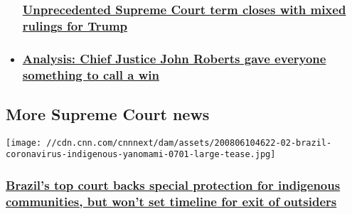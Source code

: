 \begin{itemize}
{  \subsubsection{\texorpdfstring{\href{/2020/07/10/politics/supreme-court-term-end-conservatives-liberals/index.html}{Unprecedented
  Supreme Court term closes with mixed rulings for
  Trump}}{Unprecedented Supreme Court term closes with mixed rulings for Trump}}\label{unprecedented-supreme-court-term-closes-with-mixed-rulings-for-trump}}
\item
  \hypertarget{analysis-chief-justice-john-roberts-gave-everyone-something-to-call-a-win-}{%
  \subsubsection{\texorpdfstring{\href{/2020/07/09/politics/john-roberts-supreme-court/index.html}{\textbf{Analysis:}
  Chief Justice John Roberts gave everyone something to call a win
  }}{Analysis: Chief Justice John Roberts gave everyone something to call a win }}\label{analysis-chief-justice-john-roberts-gave-everyone-something-to-call-a-win-}}
\end{itemize}

\hypertarget{more-supreme-court-news-}{%
\subsection{More Supreme Court news~}\label{more-supreme-court-news-}}

\href{/2020/08/08/americas/brazil-supreme-court-indigenous-ruling-intl/index.html}{}

\texttt{[image: //cdn.cnn.com/cnnnext/dam/assets/200806104622-02-brazil-coronavirus-indigenous-yanomami-0701-large-tease.jpg]}

\hypertarget{brazils-top-court-backs-special-protection-for-indigenous-communities-but-wont-set-timeline-for-exit-of-outsiders}{%
\subsubsection{\texorpdfstring{\href{/2020/08/08/americas/brazil-supreme-court-indigenous-ruling-intl/index.html}{Brazil's
top court backs special protection for indigenous communities, but won't
set timeline for exit of
outsiders}}{Brazil's top court backs special protection for indigenous communities, but won't set timeline for exit of outsiders}}\label{brazils-top-court-backs-special-protection-for-indigenous-communities-but-wont-set-timeline-for-exit-of-outsiders}}

